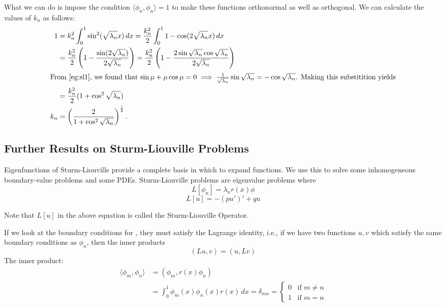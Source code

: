 What we can do is impose the condition $\langle \phi_n, \phi_n \rangle = 1$ to make these functions orthonormal as well as orthogonal. We can calculate the values of $k_n$ as follows:
\begin{align*}
	1 &= k_n^2 \int_0^1 \sin^2(\sqrt{\lambda_n} x) \,dx = \frac{k_n^2}{2} \int_0^1 1 - \cos(2\sqrt{\lambda_n}x) \,dx \\
	&= \frac{k_n^2}{2} \left(1 - \frac{\sin(2\sqrt{\lambda_n})}{2\sqrt{\lambda_n}}\right) = \frac{k_n^2}{2} \left(1 - \frac{2\sin\sqrt{\lambda_n}\cos\sqrt{\lambda_n}}{2\sqrt{\lambda_n}}\right) \\
	\intertext{From \Cref{eg:sl1}, we found that $\sin\mu + \mu\cos\mu = 0 \implies \frac{1}{\sqrt{\lambda_n}}\sin\sqrt{\lambda_n} = -\cos\sqrt{\lambda_n}$. Making this substitition yields}
	&= \frac{k_n^2}{2} (1 + \cos^2\sqrt{\lambda_n}) \\
	k_n &= \left(\frac{2}{1 + \cos^2\sqrt{\lambda_n}}\right)^{\frac12}.
\end{align*}

\subsection{Further Results on Sturm-Liouville Problems}

Eigenfunctions of Sturm-Liouville provide a complete basis in which to expand functions. We use this to solve some inhomogeneous boundary-value problems and some PDEs.
Sturm-Liouville problems are eigenvalue problems where 
\begin{equation}\label{eq6.2.1}
	L[\phi_n] = \lambda_n r(x) \phi
\end{equation}
\[
L[u] = -(pu')' + qu
\]

Note that $L[u]$ in the above equation is called the Sturm-Liouville Operator.

If we look at the boundary conditions for , they must satisfy the Lagrange identity, i.e., if we have two functions $u, v$ which satisfy the same boundary conditions as $\phi_n$, then the inner products
\[
(Lu, v) = (u, Lv)
\]
The inner product:
\begin{align*}
	\langle \phi_m, \phi_n\rangle &= (\phi_m, r(x)\phi_n) \\
	&= \int_0^1 \phi_m(x) \phi_n(x) r(x) \,dx = \delta_{mn} = \begin{cases} 0 & \text{if } m \neq n \\ 1 & \text{if } m = n \end{cases}
\end{align*}

